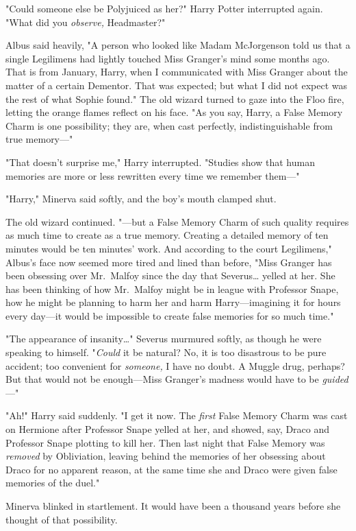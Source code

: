 "Could someone else be Polyjuiced as her?" Harry Potter interrupted again. "What did you \emph{observe,} Headmaster?"

Albus said heavily, "A person who looked like Madam McJorgenson told us that a single Legilimens had lightly touched Miss Granger's mind some months ago. That is from January, Harry, when I communicated with Miss Granger about the matter of a certain Dementor. That was expected; but what I did not expect was the rest of what Sophie found." The old wizard turned to gaze into the Floo fire, letting the orange flames reflect on his face. "As you say, Harry, a False Memory Charm is one possibility; they are, when cast perfectly, indistinguishable from true memory---"

"That doesn't surprise me," Harry interrupted. "Studies show that human memories are more or less rewritten every time we remember them---"

"Harry," Minerva said softly, and the boy's mouth clamped shut.

The old wizard continued. "---but a False Memory Charm of such quality requires as much time to create as a true memory. Creating a detailed memory of ten minutes would be ten minutes' work. And according to the court Legilimens," Albus's face now seemed more tired and lined than before, "Miss Granger has been obsessing over Mr.~Malfoy since the day that Severus{\ldots} yelled at her. She has been thinking of how Mr.~Malfoy might be in league with Professor Snape, how he might be planning to harm her and harm Harry---imagining it for hours every day---it would be impossible to create false memories for so much time."

"The appearance of insanity{\ldots}" Severus murmured softly, as though he were speaking to himself. "\emph{Could} it be natural? No, it is too disastrous to be pure accident; too convenient for \emph{someone,} I have no doubt. A Muggle drug, perhaps? But that would not be enough---Miss Granger's madness would have to be \emph{guided}---"

"Ah!" Harry said suddenly. "I get it now. The \emph{first} False Memory Charm was cast on Hermione after Professor Snape yelled at her, and showed, say, Draco and Professor Snape plotting to kill her. Then last night that False Memory was \emph{removed} by Obliviation, leaving behind the memories of her obsessing about Draco for no apparent reason, at the same time she and Draco were given false memories of the duel."

Minerva blinked in startlement. It would have been a thousand years before she thought of that possibility.

